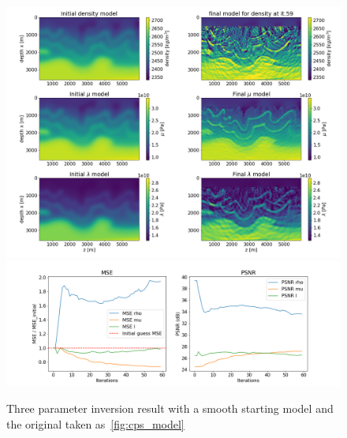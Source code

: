 \documentclass[10pt]{SelfArx} %
\theoremstyle{definition}
\begin{document}
\begin{figure}[!h]\label{fig:cps_fwi_smooth_start}
\hspace*{-0.6in}
\includegraphics[width=1.20\textwidth]{fig/cana_fwi_three_params_smooth}
\hspace*{-0.6in}
\includegraphics[width=1.20\textwidth]{fig/cana_fwi_three_params_smooth_MSE}
\caption{Three parameter inversion result with a smooth starting model and the original taken as~\cref{fig:cps_model}}
\end{figure}
\clearpage
\end{document}
